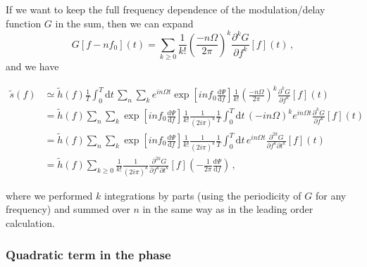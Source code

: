 \documentclass[aps,showpacs,%
prd,superscriptaddress,nofootinbib]{revtex4}
\newcommand{\be}{\begin{equation}}
\newcommand{\ee}{\end{equation}}
\newcommand\ud{{\mathrm{d}}}
\newcommand{\nn}{\nonumber}
\begin{document}
If we want to keep the full frequency dependence of the modulation/delay function $G$ in the sum, then we can expand
%
\be
	G[f-n f_{0}](t) = \sum\limits_{k\geq 0} \frac{1}{k!}\left( \frac{-n \Omega}{2\pi} \right)^{k} \frac{\partial^{k} G}{\partial f^{k}}[f](t) \,,
\ee
%
and we have
%
\begin{widetext}
\begin{align}
	\tilde{s}(f) &\simeq \tilde{h}(f) \frac{1}{T} \int_{0}^{T}\ud t\, \sum\limits_{n}\sum\limits_{k} e^{i n \Omega t} \exp\left[ i n f_{0} \frac{\ud \Psi}{\ud f} \right] \frac{1}{k!}\left( \frac{-n \Omega}{2\pi} \right)^{k} \frac{\partial^{k} G}{\partial f^{k}}[f](t) \nn\\
	&= \tilde{h}(f) \sum\limits_{n}\sum\limits_{k} \exp\left[ i n f_{0} \frac{\ud \Psi}{\ud f} \right] \frac{1}{k!} \frac{1}{(2i\pi)^{k}} \frac{1}{T} \int_{0}^{T}\ud t\, (-i n \Omega)^{k}  e^{i n \Omega t}  \frac{\partial^{k} G}{\partial f^{k}}[f](t) \nn\\
	&= \tilde{h}(f) \sum\limits_{n}\sum\limits_{k} \exp\left[ i n f_{0} \frac{\ud \Psi}{\ud f} \right] \frac{1}{k!} \frac{1}{(2i\pi)^{k}} \frac{1}{T} \int_{0}^{T}\ud t\, e^{i n \Omega t}  \frac{\partial^{2k} G}{\partial f^{k}\partial t^{k}}[f](t) \nn\\
	&= \tilde{h}(f) \sum\limits_{k\geq 0} \frac{1}{k!} \frac{1}{(2i\pi)^{k}}  \frac{\partial^{2k} G}{\partial f^{k}\partial t^{k}}[f]\left(-\frac{1}{2\pi} \frac{\ud \Psi}{\ud f} \right) \,,
\end{align}
\end{widetext}
%
where we performed $k$ integrations by parts (using the periodicity of $G$ for any frequency) and summed over $n$ in the same way as in the leading order calculation.

\subsubsection*{Quadratic term in the phase}
\end{document}
